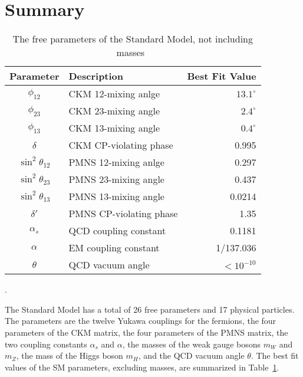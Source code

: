 \section{Summary}

\begin{table}[htbp]
\centering
\begin{tabular}{ c|l|r }
  Parameter & Description & Best Fit Value \\
  \hline
  $\phi_{12}$ & CKM 12-mixing anlge    & $13.1^\circ$ \\
  $\phi_{23}$ & CKM 23-mixing angle    & $2.4^\circ$ \\
  $\phi_{13}$ & CKM 13-mixing angle    & $0.4^\circ$ \\
  $\delta$    & CKM CP-violating phase & 0.995 \\
  \hline
  $\sin^2 \theta_{12}$ & PMNS 12-mixing anlge    & 0.297 \\
  $\sin^2 \theta_{23}$ & PMNS 23-mixing angle    & 0.437 \\
  $\sin^2 \theta_{13}$ & PMNS 13-mixing angle    & 0.0214 \\
  $\delta'$            & PMNS CP-violating phase & 1.35 \\
  \hline
  $\alpha_s$ & QCD coupling constant & 0.1181 \\
  $\alpha$ & EM coupling constant & 1/137.036 \\
  \hline
  $\theta$ & QCD vacuum angle & $< 10^{-10}$ 
\end{tabular}
\caption{ The free parameters of the Standard Model, not including masses~\cite{PDG2018}}.
\label{tab:sm_params}
\end{table}

The Standard Model has a total of 26 free parameters and 17 physical particles.
The parameters are
the twelve Yukawa couplings for the fermions,
the four parameters of the CKM matrix,
the four parameters of the PMNS matrix,
the two coupling constants $\alpha_s$ and $\alpha$,
the masses of the weak gauge bosons $m_W$ and $m_Z$,
the mass of the Higgs boson $m_H$,
and the QCD vacuum angle $\theta$.
The best fit values of the SM parameters, excluding masses, are summarized in Table~\ref{tab:sm_params}.

